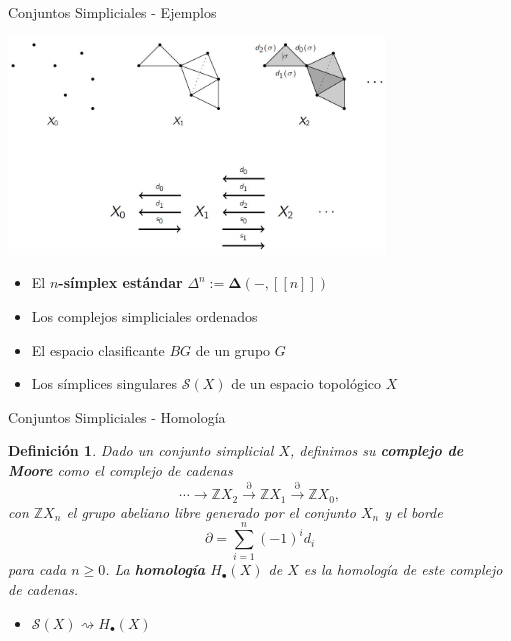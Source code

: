 \documentclass[11pt]{beamer}
\newcommand{\Z}{\mathbb{Z}}
\newcommand{\nat}[1]{[\![#1]\!]}
\newcommand{\ord}[1]{\nat{#1}}
\renewcommand{\ss}[1]{\Delta^{#1}}
\newcommand{\ordcat}{\boldsymbol{\Delta}}
\newtheorem{defs}{Definición}
\begin{document}
\begin{frame}{Conjuntos Simpliciales - Ejemplos}
\begin{center}
\includegraphics[width=0.75\textwidth]{SimplicialSetsIdea.jpg}
\end{center}
\begin{itemize}
\item <2-> El \textbf{$n$-símplex estándar} $\ss{n}  := \ordcat(-,\ord{n})$
\item <3-> Los complejos simpliciales ordenados
\item <4-> El espacio clasificante $BG$ de un grupo $G$
\item <5-> Los símplices singulares $\mathscr{S}(X)$ de un espacio topológico $X$
\end{itemize}
\end{frame}

\begin{frame}{Conjuntos Simpliciales  - Homología}
\begin{defs} Dado un conjunto simplicial $X$, definimos su \textbf{complejo de Moore} como el complejo de cadenas
\[
\cdots \to \Z X_2 \xrightarrow{\partial} \Z X_1 \xrightarrow{\partial} \Z X_0,
\]
con $\Z X_n$ el grupo abeliano libre generado por el conjunto $X_n$ y el borde
\[
\partial = \sum_{i=1}^n(-1)^i d_i
\]
para cada $n \geq 0$. La \textbf{homología} $H_\bullet(X)$ de $X$ es la homología de este complejo de cadenas.
\end{defs}
\begin{itemize}
\item <2-> $\mathscr{S}(X) \rightsquigarrow H_\bullet(X)$
\end{itemize}
\end{frame}
\end{document}
